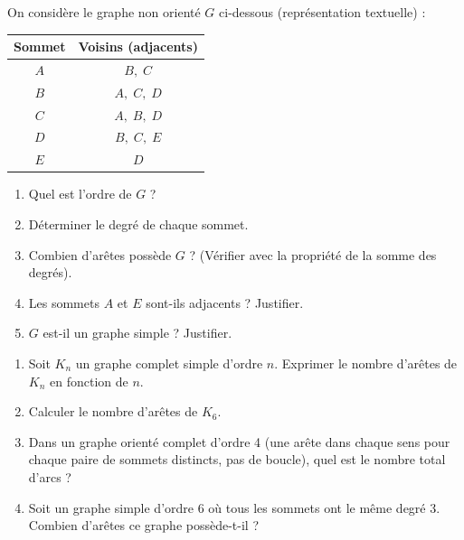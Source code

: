 \documentclass[11pt]{article}
\begin{document}
\begin{exercice}
On considère le graphe non orienté $G$ ci-dessous (représentation textuelle) :
\begin{center}
\begin{tabular}{c|c}
Sommet & Voisins (adjacents) \\ \hline
$A$ & $B,\; C$ \\
$B$ & $A,\; C,\; D$ \\
$C$ & $A,\; B,\; D$ \\
$D$ & $B,\; C,\; E$ \\
$E$ & $D$
\end{tabular}
\end{center}
\begin{enumerate}
    \item Quel est l'ordre de $G$ ?
    \item Déterminer le degré de chaque sommet.
    \item Combien d'arêtes possède $G$ ? (Vérifier avec la propriété de la somme des degrés).
    \item Les sommets $A$ et $E$ sont-ils adjacents ? Justifier.
    \item $G$ est-il un graphe simple ? Justifier.
\end{enumerate}
\end{exercice}

\begin{exercice}
\begin{enumerate}
    \item Soit $K_n$ un graphe complet simple d'ordre $n$. Exprimer le nombre d'arêtes de $K_n$ en fonction de $n$.
    \item Calculer le nombre d'arêtes de $K_6$.
    \item Dans un graphe orienté complet d'ordre 4 (une arête dans chaque sens pour chaque paire de sommets distincts, pas de boucle), quel est le nombre total d'arcs ?
    \item Soit un graphe simple d'ordre 6 où tous les sommets ont le même degré 3. Combien d'arêtes ce graphe possède-t-il ?
\end{enumerate}
\end{exercice}
\end{document}
